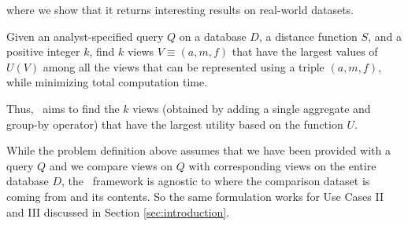 where we show that it returns interesting results on real-world datasets.
\begin{problem}
\vspace{-5pt}
Given an analyst-specified query $Q$ on a database $D$, a distance function $S$,
and a positive integer $k$, find $k$ views $V \equiv (a, m, f)$ that
have the largest values of $U(V)$ among all the views that can be represented
using a triple $(a, m, f)$, while minimizing total computation time.
\vspace{-5pt}
\end{problem}
Thus, \VizRecDB\ aims to find the $k$ views (obtained by adding a single aggregate
 and group-by operator) that have the largest utility based on the function $U$.

While the problem definition above assumes that we have been provided with a
query $Q$ and we compare views on $Q$ with corresponding views on the entire
database $D$, the \VizRecDB\ framework is agnostic to where the comparison
dataset is coming from and its contents. So the same formulation works for Use
Cases II and III discussed in Section \ref{sec:introduction}. 




